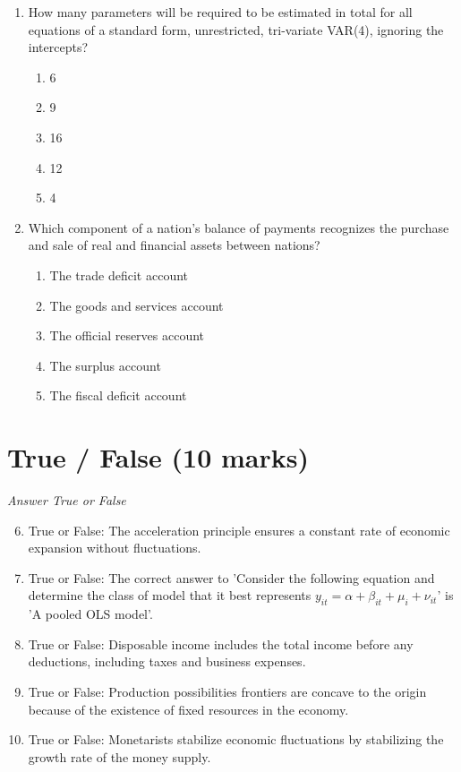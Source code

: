\documentclass[12pt]{article}
\begin{document}
\begin{enumerate}[label=\arabic*.]
\begin{enumerate}[label=(\alph*)]
    \item Yes, it specifically applies to trade agreements between neighboring countries.
    \item No, it applies wherever productive units have different relative efficiencies.
    \item Yes, it only applies to international trade.
\end{enumerate}
\item How many parameters will be required to be estimated in total for all equations of a standard form, unrestricted, tri-variate VAR(4), ignoring the intercepts?
\begin{enumerate}[label=(\alph*)]
    \item 6
    \item 9
    \item 16
    \item 12
    \item 4
\end{enumerate}
\item Which component of a nation's balance of payments recognizes the purchase and sale of real and financial assets between nations?
\begin{enumerate}[label=(\alph*)]
    \item The trade deficit account
    \item The goods and services account
    \item The official reserves account
    \item The surplus account
    \item The fiscal deficit account
\end{enumerate}
\end{enumerate}

\section*{True / False (10 marks)}
\textit{Answer True or False}
\begin{enumerate}[label=\arabic*.]
\setcounter{enumi}{5}
\item True or False: The acceleration principle ensures a constant rate of economic expansion without fluctuations.
\item True or False: The correct answer to 'Consider the following equation and determine the class of model that it best represents $y_{it} = \alpha + \beta_{it} + \mu_i + \nu_{it}$' is 'A pooled OLS model'.
\item True or False: Disposable income includes the total income before any deductions, including taxes and business expenses.
\item True or False: Production possibilities frontiers are concave to the origin because of the existence of fixed resources in the economy.
\item True or False: Monetarists stabilize economic fluctuations by stabilizing the growth rate of the money supply.
\end{enumerate}
\end{document}
